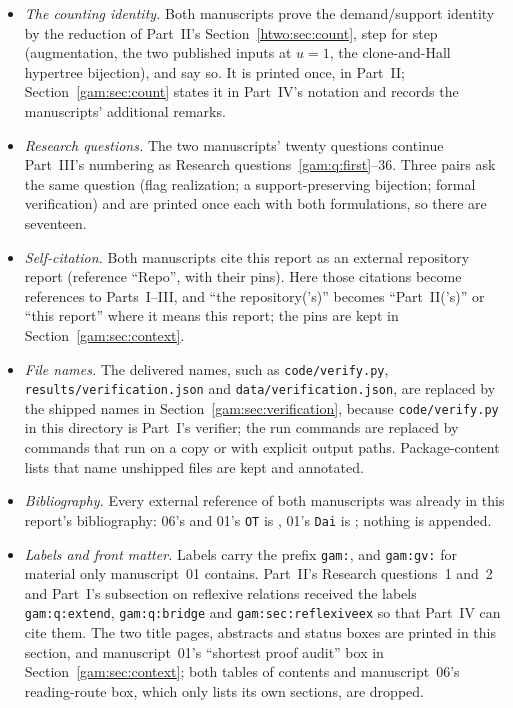 \documentclass[11pt]{article}
\numberwithin{equation}{section}
\theoremstyle{definition}
\begin{document}
\begin{itemize}[leftmargin=1.4em]
(Theorem~\ref{gam:gv:thm:blocks}) beside 06's signed form; manuscript~01's
direct initial-segment proof of the chain count and its reflection proof of
the Narayana formula.
\item \emph{The counting identity.} Both manuscripts prove the
demand/support identity by the reduction of Part~II's
Section~\ref{htwo:sec:count}, step for step (augmentation, the two
published inputs at $u=1$, the clone-and-Hall hypertree bijection), and
say so. It is printed once, in Part~II; Section~\ref{gam:sec:count} states
it in Part~IV's notation and records the manuscripts' additional remarks.
\item \emph{Research questions.} The two manuscripts' twenty questions
continue Part~III's numbering as Research questions~\ref{gam:q:first}--36.
Three pairs ask the same question (flag realization; a support-preserving
bijection; formal verification) and are printed once each with both
formulations, so there are seventeen.
\item \emph{Self-citation.} Both manuscripts cite this report as an external
repository report (reference ``Repo'', with their pins). Here those
citations become references to Parts~I--III, and ``the repository('s)''
becomes ``Part~II('s)'' or ``this report'' where it means this report; the
pins are kept in Section~\ref{gam:sec:context}.
\item \emph{File names.} The delivered names, such as
\nolinkurl{code/verify.py}, \nolinkurl{results/verification.json} and
\nolinkurl{data/verification.json}, are replaced by the shipped names in
Section~\ref{gam:sec:verification},
because \texttt{code/verify.py} in this directory is Part~I's verifier; the
run commands are replaced by commands that run on a copy or with explicit
output paths. Package-content lists that name unshipped files are kept and
annotated.
\item \emph{Bibliography.} Every external reference of both manuscripts was
already in this report's bibliography: 06's and 01's \texttt{OT} is
\cite{OT20}, 01's \texttt{Dai} is \cite{DHLTW}; nothing is appended.
\item \emph{Labels and front matter.} Labels carry the prefix \texttt{gam:},
and \texttt{gam:gv:} for material only manuscript~01 contains. Part~II's
Research questions~1 and~2 and Part~I's subsection on reflexive relations
received the labels \texttt{gam:q:extend}, \texttt{gam:q:bridge} and
\texttt{gam:sec:reflexiveex} so that Part~IV can cite them. The two title
pages, abstracts and status boxes are printed in this section, and
manuscript~01's ``shortest proof audit'' box in Section~\ref{gam:sec:context};
both tables of contents and manuscript~06's reading-route box, which only
lists its own sections, are dropped.
\end{itemize}
\end{document}
